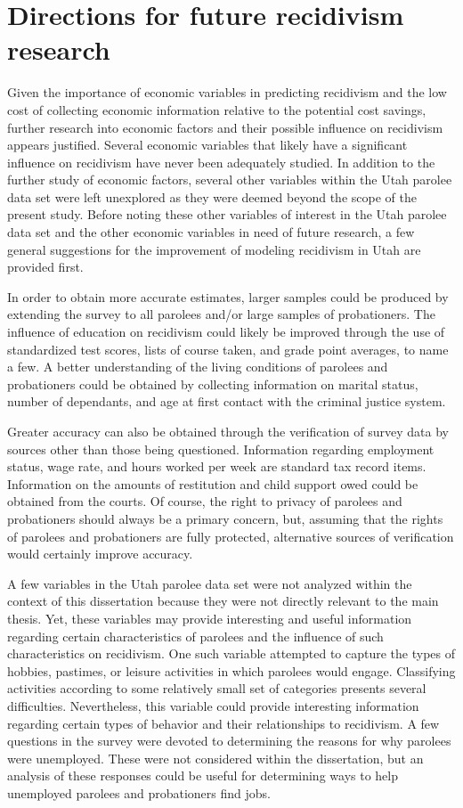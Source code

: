 \section{Directions for future recidivism research}

Given the importance of economic variables in predicting recidivism and the low cost of collecting economic information relative to the potential cost savings, further research into economic factors and their possible influence on recidivism appears justified.  Several economic variables that likely have a significant influence on recidivism have never been adequately studied.  In addition to the further study of economic factors, several other variables within the Utah parolee data set were left unexplored as they were deemed beyond the scope of the present study.      Before noting these other variables of interest in the Utah parolee data set and the other economic variables in need of future research, a few general suggestions for the improvement of modeling recidivism in Utah are provided first.

In order to obtain more accurate estimates, larger samples could be produced by extending the survey to all parolees and/or large samples of probationers.  The influence of education on recidivism could likely be improved through the use of standardized test scores, lists of course taken, and grade point averages, to name a few.  A better understanding of the living conditions of parolees and probationers could be obtained by collecting information on marital status, number of dependants, and age at first contact with the criminal justice system.

Greater accuracy can also be obtained through the verification of survey data by sources other than those being questioned.  Information regarding employment status, wage rate, and hours worked per week are standard tax record items.  Information on the amounts of restitution and child support owed could be obtained from the courts.  Of course, the right to privacy of parolees and probationers should always be a primary concern, but, assuming that the rights of parolees and probationers are fully protected, alternative sources of verification would certainly improve accuracy.

A few variables in the Utah parolee data set were not analyzed within the context of this dissertation because they were not directly relevant to the main thesis.  Yet, these variables may provide interesting and useful information regarding certain characteristics of parolees and the influence of such characteristics on recidivism.  One such variable attempted to capture the types of hobbies, pastimes, or leisure activities in which parolees would engage.  Classifying activities according to some relatively small set of categories presents several difficulties.  Nevertheless, this variable could provide interesting information regarding certain types of behavior and their relationships to recidivism.  A few questions in the survey were devoted to determining the reasons for why parolees were unemployed.  These were not considered within the dissertation, but an analysis of these responses could be useful for determining ways to help unemployed parolees and probationers find jobs.

